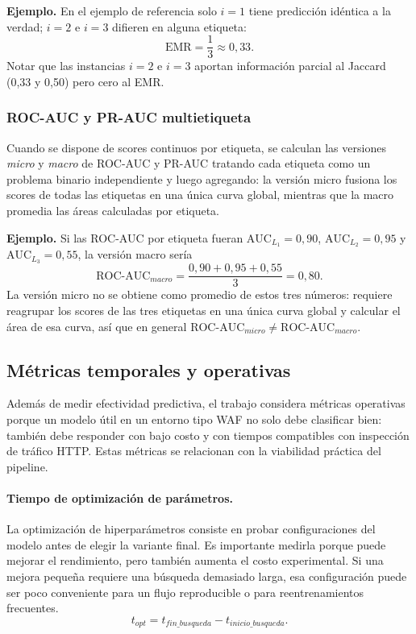 \documentclass[12pt,oneside]{report}
\begin{document}
\textbf{Ejemplo.} En el ejemplo de referencia solo $i=1$ tiene
predicción idéntica a la verdad; $i=2$ e $i=3$ difieren en alguna
etiqueta:
\[
\mathrm{EMR}=\frac{1}{3}\approx 0{,}33.
\]
Notar que las instancias $i=2$ e $i=3$ aportan información parcial al
Jaccard (0{,}33 y 0{,}50) pero cero al EMR.

\subsubsection{ROC-AUC y PR-AUC multietiqueta}

Cuando se dispone de scores continuos por etiqueta, se calculan las
versiones \emph{micro} y \emph{macro} de ROC-AUC y PR-AUC tratando cada
etiqueta como un problema binario independiente y luego agregando: la
versión micro fusiona los scores de todas las etiquetas en una única
curva global, mientras que la macro promedia las áreas calculadas por
etiqueta.

\textbf{Ejemplo.} Si las ROC-AUC por etiqueta fueran $\mathrm{AUC}_{L_1}=0{,}90$,
$\mathrm{AUC}_{L_2}=0{,}95$ y $\mathrm{AUC}_{L_3}=0{,}55$, la versión
macro sería
\[
\mathrm{ROC\text{-}AUC}_{macro}=\frac{0{,}90+0{,}95+0{,}55}{3}=0{,}80.
\]
La versión micro no se obtiene como promedio de estos tres números:
requiere reagrupar los scores de las tres etiquetas en una única curva
global y calcular el área de esa curva, así que en general
$\mathrm{ROC\text{-}AUC}_{micro}\ne \mathrm{ROC\text{-}AUC}_{macro}$.

\subsection{Métricas temporales y operativas}

Además de medir efectividad predictiva, el trabajo considera métricas operativas porque un modelo útil en un entorno tipo WAF no solo debe clasificar bien: también debe responder con bajo costo y con tiempos compatibles con inspección de tráfico HTTP. Estas métricas se relacionan con la viabilidad práctica del pipeline.

\paragraph{Tiempo de optimización de parámetros.}
La optimización de hiperparámetros consiste en probar configuraciones del modelo antes de elegir la variante final. Es importante medirla porque puede mejorar el rendimiento, pero también aumenta el costo experimental. Si una mejora pequeña requiere una búsqueda demasiado larga, esa configuración puede ser poco conveniente para un flujo reproducible o para reentrenamientos frecuentes.
\[
t_{opt}=t_{fin\_busqueda}-t_{inicio\_busqueda}.
\]
\end{document}
